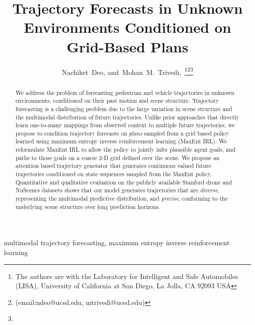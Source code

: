 \documentclass[journal]{IEEEtran}
\begin{document}
\title{Trajectory Forecasts in Unknown Environments Conditioned on Grid-Based Plans}


\author{Nachiket~Deo,
       and~Mohan~M.~Trivedi,~\thanks{The authors are with the Laboratory for Intelligent and Safe Automobiles
(LISA), University of California at San Diego, La Jolla, CA 92093 USA}\thanks{(email:ndeo@ucsd.edu, mtrivedi@ucsd.edu)}\thanks{}}

















\maketitle



\begin{abstract}
We address the problem of forecasting pedestrian and vehicle trajectories in unknown environments, conditioned on their past motion and scene structure.
Trajectory forecasting is a challenging problem due to the large variation in scene structure and the multimodal distribution of future trajectories. Unlike prior approaches that directly learn one-to-many mappings from observed context to multiple future trajectories, we propose to condition trajectory forecasts on \textit{plans} sampled from a grid based policy learned using maximum entropy inverse reinforcement learning (MaxEnt IRL). We reformulate MaxEnt IRL to allow the policy to jointly infer plausible agent goals, and paths to those goals on a coarse 2-D grid defined over the scene. We propose an attention based trajectory generator that generates continuous valued future trajectories conditioned on state sequences sampled from the MaxEnt policy. Quantitative and qualitative evaluation on the publicly available Stanford drone and NuScenes datasets shows that our model generates trajectories that are \textit{diverse}, representing the multimodal predictive distribution, and \textit{precise}, conforming to the underlying scene structure over long prediction horizons. 
\end{abstract}

\begin{IEEEkeywords}
multimodal trajectory forecasting, maximum entropy inverse reinforcement learning
\end{IEEEkeywords}
\end{document}
